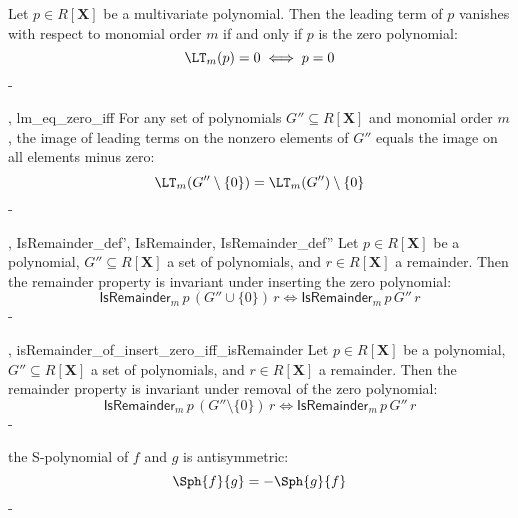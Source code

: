 \begin{lemma}\label{lm_eq_zero_iff}
  \leanok
  Let $p \in R[\mathbf{X}]$ be a multivariate polynomial. Then the leading term of $p$
vanishes with respect to monomial order $m$ if and only if $p$ is the zero polynomial:
\[
\LT_m(p) = 0 \iff p = 0
\]
-
\end{lemma}

\begin{lemma}\label{leadingTerm_image_sdiff_singleton_zero}
  \leanok
  ,
{lm_eq_zero_iff}
  For any set of polynomials $G'' \subseteq R[\mathbf{X}]$ and monomial order $m$,
the image of leading terms on the nonzero elements of $G''$ equals the image on all
elements minus zero:
\[
\LT_m(G'' \setminus \{0\}) = \LT_m(G'') \setminus \{0\}
\]
-
\end{lemma}

\begin{lemma}\label{isRemainder_of_insert_zero_iff_isRemainder}
  \leanok
  ,
{IsRemainder_def'},
{IsRemainder},
{IsRemainder_def''}
  Let $p \in R[\mathbf{X}]$ be a polynomial, $G'' \subseteq R[\mathbf{X}]$ a set of polynomials,
and $r \in R[\mathbf{X}]$ a remainder. Then the remainder property is invariant under
inserting the zero polynomial:
\[
\mathsf{IsRemainder}_m\,p\,(G'' \cup \{0\})\,r \iff \mathsf{IsRemainder}_m\,p\,G''\,r
\]
-
\end{lemma}

\begin{lemma}\label{isRemainder_of_singleton_zero_iff_isRemainder}
  \leanok
  ,
{isRemainder_of_insert_zero_iff_isRemainder}
  Let $p \in R[\mathbf{X}]$ be a polynomial, $G'' \subseteq R[\mathbf{X}]$ a set of polynomials,
and $r \in R[\mathbf{X}]$ a remainder. Then the remainder property is invariant under
removal of the zero polynomial:
\[
\mathsf{IsRemainder}_m\,p\,(G'' \setminus \{0\})\,r \iff \mathsf{IsRemainder}_m\,p\,G''\,r
\]
-
\end{lemma}

\begin{lemma}\label{sPolynomial_antisymm}
  \leanok
  the S-polynomial of $f$ and $g$ is antisymmetric:
\[
\Sph{f}{g} = -\Sph{g}{f}
\]
-
\end{lemma}

